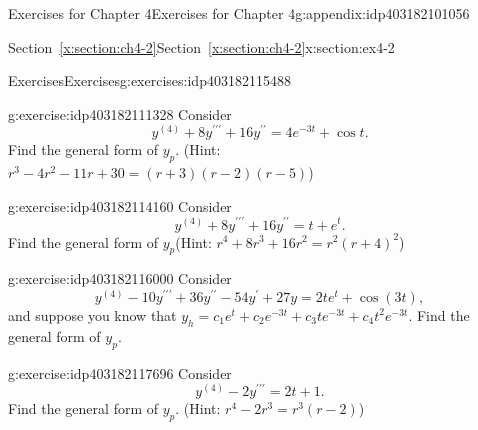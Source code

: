 \documentclass[oneside,10pt,]{book}
\newcommand{\xreffont}{\relax}
\numberwithin{equation}{section}
\numberwithin{equation}{section}
\begin{document}
\begin{appendixptx}{Exercises for Chapter 4}{}{Exercises for Chapter 4}{}{}{g:appendix:idp403182101056}
\begin{sectionptx}{Section~{\xreffont\ref*{x:section:ch4-2}}}{}{Section~{\xreffont\ref*{x:section:ch4-2}}}{}{}{x:section:ex4-2}
\typeout{************************************************}
%
\begin{exercises-subsection-numberless}{Exercises}{}{Exercises}{}{}{g:exercises:idp403182115488}
\begin{divisionexercise}{1}{}{}{g:exercise:idp403182111328}%
Consider%
\begin{equation*}
y^{(4)}+8y^{\prime\prime\prime}+16y^{\prime\prime}=4e^{-3t}+\cos t.
\end{equation*}
Find the general form of \(y_{p}\). (Hint: \(r^{3}-4r^{2}-11r+30=\left(r+3\right)\left(r-2\right)\left(r-5\right)\))%
\end{divisionexercise}%
\begin{divisionexercise}{2}{}{}{g:exercise:idp403182114160}%
Consider%
\begin{equation*}
y^{(4)}+8y^{\prime\prime\prime}+16y^{\prime\prime}=t+e^{t}.
\end{equation*}
Find the general form of \(y_{p}\)(Hint: \(r^{4}+8r^{3}+16r^{2}=r^{2}\left(r+4\right)^{2}\))%
\end{divisionexercise}%
\begin{divisionexercise}{3}{}{}{g:exercise:idp403182116000}%
Consider%
\begin{equation*}
y^{(4)}-10y^{\prime\prime\prime}+36y^{\prime\prime}-54y^{\prime}+27y=2te^{t}+\cos(3t),
\end{equation*}
and suppose you know that \(y_{h}=c_{1}e^{t}+c_{2}e^{-3t}+c_{3}te^{-3t}+c_{4}t^{2}e^{-3t}\). Find the general form of \(y_{p}\).%
\end{divisionexercise}%
\begin{divisionexercise}{4}{}{}{g:exercise:idp403182117696}%
Consider%
\begin{equation*}
y^{(4)}-2y^{\prime\prime\prime}=2t+1.
\end{equation*}
Find the general form of \(y_{p}\). (Hint: \(r^{4}-2r^{3}=r^{3}\left(r-2\right)\))%
\end{divisionexercise}%
\end{exercises-subsection-numberless}
\end{sectionptx}
\end{appendixptx}
%
%
\typeout{************************************************}
\typeout{************************************************}
%
\end{document}
